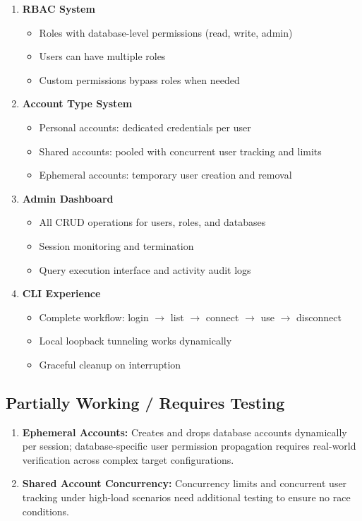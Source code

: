 \begin{enumerate}
    \item \textbf{RBAC System}
    \begin{itemize}
        \item Roles with database-level permissions (read, write, admin)
        \item Users can have multiple roles
        \item Custom permissions bypass roles when needed
    \end{itemize}
    
    \item \textbf{Account Type System}
    \begin{itemize}
        \item Personal accounts: dedicated credentials per user
        \item Shared accounts: pooled with concurrent user tracking and limits
        \item Ephemeral accounts: temporary user creation and removal
    \end{itemize}
    
    \item \textbf{Admin Dashboard}
    \begin{itemize}
        \item All CRUD operations for users, roles, and databases
        \item Session monitoring and termination
        \item Query execution interface and activity audit logs
    \end{itemize}
    
    \item \textbf{CLI Experience}
    \begin{itemize}
        \item Complete workflow: login $\rightarrow$ list $\rightarrow$ connect $\rightarrow$ use $\rightarrow$ disconnect
        \item Local loopback tunneling works dynamically
        \item Graceful cleanup on interruption
    \end{itemize}
\end{enumerate}

\subsection{Partially Working / Requires Testing}

\begin{enumerate}
    \item \textbf{Ephemeral Accounts:} Creates and drops database accounts dynamically per session; database-specific user permission propagation requires real-world verification across complex target configurations.
    
    \item \textbf{Shared Account Concurrency:} Concurrency limits and concurrent user tracking under high-load scenarios need additional testing to ensure no race conditions.
\end{enumerate}

